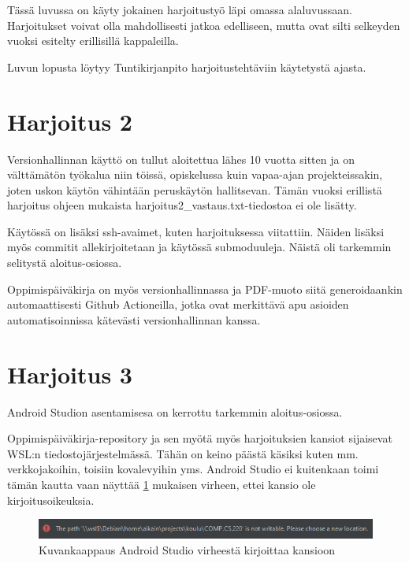 Tässä luvussa on käyty jokainen harjoitustyö läpi omassa alaluvussaan.
Harjoitukset voivat olla mahdollisesti jatkoa edelliseen, mutta ovat
silti selkeyden vuoksi esitelty erillisillä kappaleilla.

Luvun lopusta löytyy Tuntikirjanpito harjoitustehtäviin käytetystä ajasta.

\section{Harjoitus 2}

Versionhallinnan käyttö on tullut aloitettua lähes 10 vuotta sitten ja on
välttämätön työkalua niin töissä, opiskelussa kuin vapaa-ajan projekteissakin,
joten uskon käytön vähintään peruskäytön hallitsevan. Tämän vuoksi erillistä
harjoitus ohjeen mukaista harjoitus2\_vastaus.txt-tiedostoa ei ole lisätty.

Käytössä on lisäksi ssh-avaimet, kuten harjoituksessa viitattiin. Näiden
lisäksi myös commitit allekirjoitetaan ja käytössä submoduuleja. Näistä oli
tarkemmin selitystä aloitus-osiossa.

Oppimispäiväkirja on myös versionhallinnassa ja PDF-muoto siitä generoidaankin
automaattisesti Github Actioneilla, jotka ovat merkittävä apu asioiden
automatisoinnissa kätevästi versionhallinnan kanssa.

\section{Harjoitus 3}

Android Studion asentamisesa on kerrottu tarkemmin aloitus-osiossa.

Oppimispäiväkirja-repository ja sen myötä myös harjoituksien kansiot
sijaisevat WSL:n tiedostojärjestelmässä. Tähän on keino päästä käsiksi kuten
mm. verkkojakoihin, toisiin kovalevyihin yms. Android Studio ei kuitenkaan
toimi tämän kautta vaan näyttää \ref{fig:android-studio-path-not-writable}
mukaisen virheen, ettei kansio ole kirjoitusoikeuksia.

\begin{figure}[h!]
    \includegraphics[width=\textwidth]{figures/android-studio-path-not-writable.png}
    \caption{Kuvankaappaus Android Studio virheestä kirjoittaa kansioon}
    \label{fig:android-studio-path-not-writable}
\end{figure}

